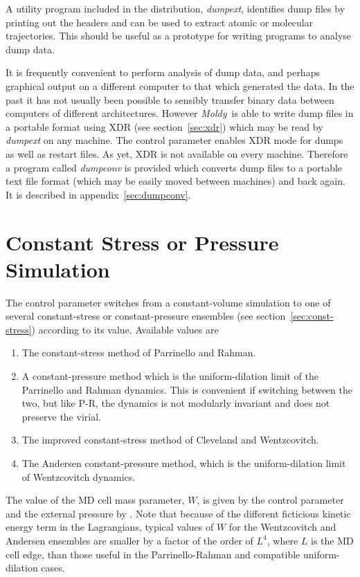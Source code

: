 \documentclass[a4paper,twoside]{report}
\newcommand{\moldy}{\emph{Moldy}}
\begin{document}
A utility program included in the distribution, \emph{dumpext},
identifies dump files by printing out the headers and
can be used to extract atomic or molecular trajectories. This
should be useful as a prototype for writing programs to analyse
dump data.

It is frequently convenient to perform analysis of dump data, and
perhaps graphical output on a different computer to that which
generated the data.  In the past it has not usually been possible to
sensibly transfer binary data between computers of different
architectures.  However \moldy\ is able to write dump files in a
portable format using XDR (see section~\ref{sec:xdr}) which may be
read by \emph{dumpext} on any machine.  The control parameter
 enables XDR mode for dumps as well as restart files.
As yet, XDR is not available on every machine.  Therefore a program
called \emph{dumpconv} is provided which converts dump files to a
portable text file format (which may be easily moved between machines)
and back again. It is described in appendix~\ref{sec:dumpconv}.


\section{Constant Stress or Pressure Simulation}%

The control parameter  switches from a
constant-volume simulation to one of several con\-stant-stress or
constant-pressure ensembles (see section~\ref{sec:const-stress})
according to its value.  Available values are
\begin{enumerate}
\item The constant-stress method of Parrinello and
  Rahman\cite{parrinello:81}.
\item A constant-pressure method which is the uniform-dilation limit
  of the Parrinello and Rahman dynamics.  This is convenient if
  switching between the two, but like P-R, the dynamics is not
  modularly invariant and does not preserve the virial.
\item The improved constant-stress method of
  Cleveland\cite{cleveland:88} and Wentzcovitch\cite{wentzcovitch:91}.
\item The Andersen constant-pressure method\cite{andersen:80}, which is the
  uniform-dilation limit of Wentzcovitch dynamics.
\end{enumerate}
The value of the MD cell mass parameter, $W$, is given by the control
parameter  and the external pressure by .  Note
that because of the different ficticious kinetic energy term in the
Lagrangians, typical values of $W$ for the Wentzcovitch and Andersen
ensembles are smaller by a factor of the order of $L^4$, where $L$ is
the MD cell edge, than those useful in the Parrinello-Rahman and
compatible uniform-dilation cases.
\end{document}
